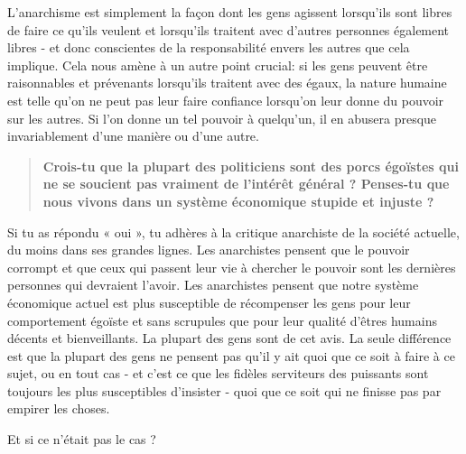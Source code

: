 L'anarchisme est simplement la façon dont les gens agissent lorsqu'ils sont libres de faire ce qu'ils veulent et lorsqu'ils traitent avec d'autres personnes également libres - et donc conscientes de la responsabilité envers les autres que cela implique. Cela nous amène à un autre point crucial: si les gens peuvent être raisonnables et prévenants lorsqu'ils traitent avec des égaux, la nature humaine est telle qu'on ne peut pas leur faire confiance lorsqu'on leur donne du pouvoir sur les autres. Si l'on donne un tel pouvoir à quelqu'un, il en abusera presque invariablement d'une manière ou d'une autre.

\begin{quotation}
\textbf{Crois-tu que la plupart des politiciens sont des porcs égoïstes qui ne se soucient pas vraiment de l'intérêt général ? Penses-tu que nous vivons dans un système économique stupide et injuste ?}
\end{quotation}

Si tu as répondu « oui », tu adhères à la critique anarchiste de la société actuelle, du moins dans ses grandes lignes. Les anarchistes pensent que le pouvoir corrompt et que ceux qui passent leur vie à chercher le pouvoir sont les dernières personnes qui devraient l'avoir. Les anarchistes pensent que notre système économique actuel est plus susceptible de récompenser les gens pour leur comportement égoïste et sans scrupules que pour leur qualité d'êtres humains décents et bienveillants. La plupart des gens sont de cet avis. La seule différence est que la plupart des gens ne pensent pas qu'il y ait quoi que ce soit à faire à ce sujet, ou en tout cas - et c'est ce que les fidèles serviteurs des puissants sont toujours les plus susceptibles d'insister - quoi que ce soit qui ne finisse pas par empirer les choses.

Et si ce n'était pas le cas ?

